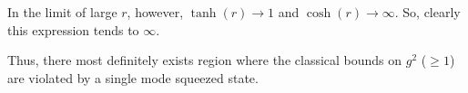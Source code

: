 \begin{homeworkProblem}
    In the limit of large $ r $, however, $ \tanh(r) \to 1 $ and $ \cosh(r) \to
    \infty $. So, clearly this expression tends to $ \infty $.

    Thus, there most definitely exists region where the classical bounds on $
    g^2 $ ($ \ge 1 $) are violated by a single mode squeezed state.
\end{homeworkProblem}
